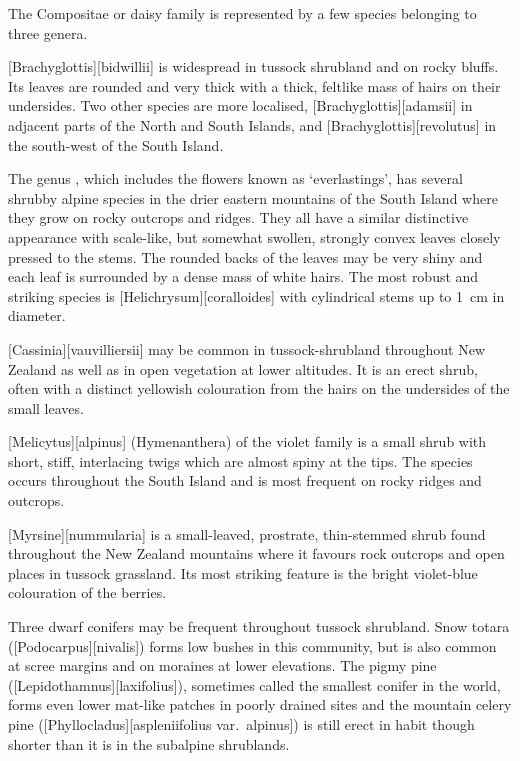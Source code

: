 The Compositae or daisy family is represented by a few species belonging to three genera.

[Brachyglottis][bidwillii] is widespread in tussock shrubland and on rocky bluffs.
Its leaves are rounded and very thick with a thick, feltlike mass of hairs on their undersides.
Two other species are more localised, [Brachyglottis][adamsii] in adjacent parts of the North and South Islands, and [Brachyglottis][revolutus] in the south-west of the South Island.

The genus , which includes the flowers known as `everlastings', has several shrubby alpine species in the drier eastern mountains of the South Island where they grow on rocky outcrops and ridges.
They all have a similar distinctive appearance with scale-like, but somewhat swollen, strongly convex leaves closely pressed to the stems.
The rounded backs of the leaves may be very shiny and each leaf is surrounded by a dense mass of white hairs.
The most robust and striking species is [Helichrysum][coralloides] with cylindrical stems up to \SI{1}{\centi\metre} in diameter.

[Cassinia][vauvilliersii] may be common in tussock-shrubland throughout New Zealand as well as in open vegetation at lower altitudes.
It is an erect shrub, often with a distinct yellowish colouration from the hairs on the undersides of the small leaves.

[Melicytus][alpinus] (Hymenanthera) of the violet family is a small shrub with short, stiff, interlacing twigs which are almost spiny at the tips.
The species occurs throughout the South Island and is most frequent on rocky ridges and outcrops.

[Myrsine][nummularia] is a small-leaved, prostrate, thin-stemmed shrub found throughout the New Zealand mountains where it favours rock outcrops and open places in tussock grassland.
Its most striking feature is the bright violet-blue colouration of the berries.

Three dwarf conifers may be frequent throughout tussock shrubland.
Snow totara ([Podocarpus][nivalis]) forms low bushes in this community, but is also common at scree margins and on moraines at lower elevations.
The pigmy pine ([Lepidothamnus][laxifolius]), sometimes called the smallest conifer in the world, forms even lower mat-like patches in poorly drained sites and the mountain celery pine ([Phyllocladus][aspleniifolius var.\ alpinus]) is still erect in habit though shorter than it is in the subalpine shrublands.

